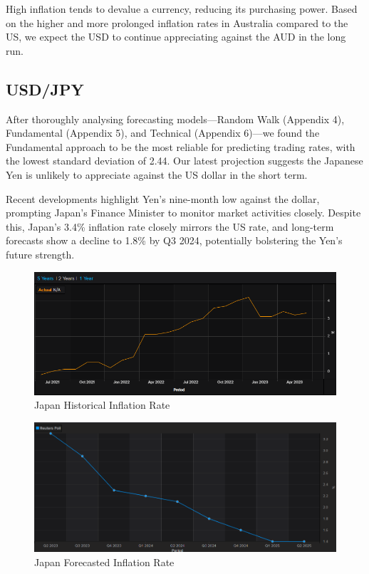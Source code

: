 \documentclass{article}
\let\Oldsubsection\subsection
\renewcommand{\subsection}{\FloatBarrier\Oldsubsection}
\begin{document}
\noindent High inflation tends to devalue a currency, reducing its purchasing power. Based on the higher and more prolonged inflation rates in Australia compared to the US, we expect the USD to continue appreciating against the AUD in the long run.

\subsection*{USD/JPY}

After thoroughly analysing forecasting models—Random Walk (Appendix 4), Fundamental (Appendix 5), and Technical (Appendix 6)—we found the Fundamental approach to be the most reliable for predicting trading rates, with the lowest standard deviation of 2.44. Our latest projection suggests the Japanese Yen is unlikely to appreciate against the US dollar in the short term. 

\noindent Recent developments highlight Yen's nine-month low against the dollar, prompting Japan's Finance Minister to monitor market activities closely. Despite this, Japan's 3.4\% inflation rate closely mirrors the US rate, and long-term forecasts show a decline to 1.8\% by Q3 2024, potentially bolstering the Yen's future strength.

\begin{figure}[h!]
    \centering
    \includegraphics[scale=0.5]{graphs/JPY-CPI.png}
    \caption{Japan Historical Inflation Rate}
    \label{Japan Historical Inflation Rate}
\end{figure}

\begin{figure}[h!]
    \centering
    \includegraphics[scale=0.4]{graphs/JPY-forecastedCPI.png}
    \caption{Japan Forecasted Inflation Rate}
    \label{Japan Forecasted Inflation Rate}
\end{figure}
\end{document}
